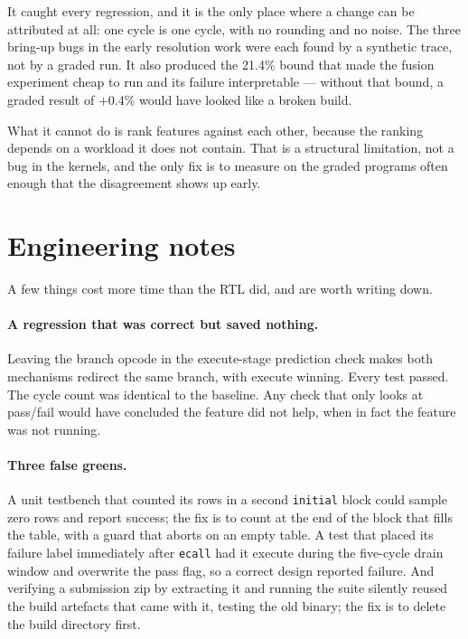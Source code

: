 \documentclass[11pt]{article}
\begin{document}
It caught every regression, and it is the only place where a change can be attributed at all:
one cycle is one cycle, with no rounding and no noise. The three bring-up bugs in the early
resolution work were each found by a synthetic trace, not by a graded run. It also produced the
21.4\% bound that made the fusion experiment cheap to run and its failure interpretable ---
without that bound, a graded result of $+0.4\%$ would have looked like a broken build.

What it cannot do is rank features against each other, because the ranking depends on a workload
it does not contain. That is a structural limitation, not a bug in the kernels, and the only fix
is to measure on the graded programs often enough that the disagreement shows up early.

\section{Engineering notes}

A few things cost more time than the RTL did, and are worth writing down.

\paragraph{A regression that was correct but saved nothing.} Leaving the branch opcode in the
execute-stage prediction check makes both mechanisms redirect the same branch, with execute
winning. Every test passed. The cycle count was identical to the baseline. Any check that only
looks at pass/fail would have concluded the feature did not help, when in fact the feature was
not running.

\paragraph{Three false greens.} A unit testbench that counted its rows in a second
\texttt{initial} block could sample zero rows and report success; the fix is to count at the end
of the block that fills the table, with a guard that aborts on an empty table. A test that
placed its failure label immediately after \texttt{ecall} had it execute during the five-cycle
drain window and overwrite the pass flag, so a correct design reported failure. And verifying a
submission zip by extracting it and running the suite silently reused the build artefacts that
came with it, testing the old binary; the fix is to delete the build directory first.
\end{document}
